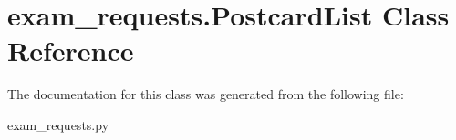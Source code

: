 \hypertarget{classexam__requests_1_1PostcardList}{}\section{exam\+\_\+requests.\+Postcard\+List Class Reference}
\label{classexam__requests_1_1PostcardList}


The documentation for this class was generated from the following file\+:\begin{DoxyCompactItemize}
\item 
exam\+\_\+requests.\+py\end{DoxyCompactItemize}
